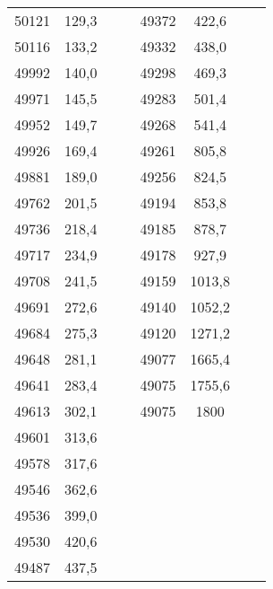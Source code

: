 \documentclass[11pt]{article}
\begin{document}
{{\begin{tabular}{|c|c|c|c|c|c|c|c|}
            \cline{1-2} \cline{5-6} 
            50121 & 129,3 &  &  & 49372 & 422,6 &  & \tabularnewline
            \cline{1-2} \cline{5-6} 
            50116 & 133,2 &  &  & 49332 & 438,0 &  & \tabularnewline
            \cline{1-2} \cline{5-6} 
            49992 & 140,0 &  &  & 49298 & 469,3 &  & \tabularnewline
            \cline{1-2} \cline{5-6} 
            49971 & 145,5 &  &  & 49283 & 501,4 &  & \tabularnewline
            \cline{1-2} \cline{5-6} 
            49952 & 149,7 &  &  & 49268 & 541,4 &  & \tabularnewline
            \cline{1-2} \cline{5-6} 
            49926 & 169,4 &  &  & 49261 & 805,8 &  & \tabularnewline
            \cline{1-2} \cline{5-6} 
            49881 & 189,0 &  &  & 49256 & 824,5 &  & \tabularnewline
            \cline{1-2} \cline{5-6} 
            49762 & 201,5 &  &  & 49194 & 853,8 &  & \tabularnewline
            \cline{1-2} \cline{5-6} 
            49736 & 218,4 &  &  & 49185 & 878,7 &  & \tabularnewline
            \cline{1-2} \cline{5-6} 
            49717 & 234,9 &  &  & 49178 & 927,9 &  & \tabularnewline
            \cline{1-2} \cline{5-6} 
            49708 & 241,5 &  &  & 49159 & 1013,8 &  & \tabularnewline
            \cline{1-2} \cline{5-6} 
            49691 & 272,6 &  &  & 49140 & 1052,2 &  & \tabularnewline
            \cline{1-2} \cline{5-6} 
            49684 & 275,3 &  &  & 49120 & 1271,2 &  & \tabularnewline
            \cline{1-2} \cline{5-6} 
            49648 & 281,1 &  &  & 49077 & 1665,4 &  & \tabularnewline
            \cline{1-2} \cline{5-6} 
            49641 & 283,4 &  &  & 49075 & 1755,6 &  & \tabularnewline
            \cline{1-2} \cline{5-6} 
            49613 & 302,1 &  &  & 49075 & 1800 &  & \tabularnewline
            \cline{1-2} \cline{5-6} 
            49601 & 313,6 &  & \multicolumn{1}{c}{} & \multicolumn{1}{c}{} & \multicolumn{1}{c}{} &  & \tabularnewline
            \cline{1-2} 
            49578 & 317,6 &  & \multicolumn{1}{c}{} & \multicolumn{1}{c}{} & \multicolumn{1}{c}{} &  & \tabularnewline
            \cline{1-2} 
            49546 & 362,6 &  & \multicolumn{1}{c}{} & \multicolumn{1}{c}{} & \multicolumn{1}{c}{} &  & \tabularnewline
            \cline{1-2} 
            49536 & 399,0 &  & \multicolumn{1}{c}{} & \multicolumn{1}{c}{} & \multicolumn{1}{c}{} &  & \tabularnewline
            \cline{1-2} 
            49530 & 420,6 &  & \multicolumn{1}{c}{} & \multicolumn{1}{c}{} & \multicolumn{1}{c}{} &  & \tabularnewline
            \cline{1-2} 
            49487 & 437,5 &  & \multicolumn{1}{c}{} & \multicolumn{1}{c}{} & \multicolumn{1}{c}{} &  & \tabularnewline
            \cline{1-2} 

\end{tabular}}}
\end{document}
